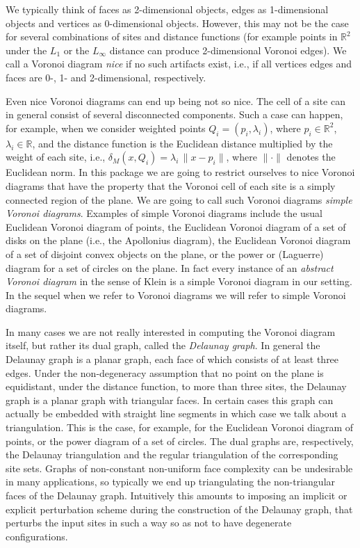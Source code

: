 We typically think of faces as 2-dimensional objects, edges as
1-dimensional objects and vertices as 0-dimensional objects. However,
this may not be the case for several combinations of sites and
distance functions (for example points in $\mathbb{R}^2$ under the
$L_1$ or the $L_\infty$ distance can produce 2-dimensional Voronoi
edges). We call a Voronoi diagram \emph{nice} if no such artifacts
exist, i.e., if all vertices edges and faces are 0-, 1- and
2-dimensional, respectively.

Even nice Voronoi diagrams can end up being not so nice. The cell of a
site can in general consist of several disconnected components. Such a
case can happen, for example, when we consider weighted points
$Q_i=(p_i,\lambda_i)$, where $p_i\in\mathbb{R}^2$,
$\lambda_i\in\mathbb{R}$, and the distance function is 
the Euclidean distance multiplied by the weight of each site, i.e.,
$\delta_M(x,Q_i)=\lambda_i\,\|x-p_i\|$, where $\|\cdot\|$ denotes the
Euclidean norm. In this package we are going to restrict ourselves to
nice Voronoi diagrams that have the property that the Voronoi cell of
each site is a simply connected region of the plane. We are going to
call such Voronoi diagrams \emph{simple Voronoi diagrams}. Examples of
simple Voronoi diagrams include the usual Euclidean Voronoi diagram of
points, the Euclidean Voronoi diagram of a set of disks on the plane
(i.e., the Apollonius diagram), the Euclidean Voronoi diagram of a set
of disjoint convex objects on the plane, or the power or (Laguerre)
diagram for a set of circles on the plane. In fact every instance of
an \emph{abstract Voronoi diagram} in the sense of Klein \cite{k-cavd-89} 
is a simple Voronoi diagram in our setting. In the sequel when we
refer to Voronoi diagrams we will refer to simple Voronoi diagrams.

In many cases we are not really interested in computing the
Voronoi diagram itself, but rather its dual graph, called the
\emph{Delaunay graph}. In general the Delaunay graph is a planar
graph, each face of which consists of at least three edges.
Under the non-degeneracy assumption that no point on the plane is
equidistant, under the distance function, to more than three sites, 
the Delaunay graph is a planar graph with triangular faces.
In certain cases this graph can actually be embedded with straight
line segments in which case we talk about a triangulation. This is the
case, for example, for the Euclidean Voronoi diagram of points, or the
power diagram of a set of circles. The dual graphs are, respectively,
the Delaunay triangulation and the regular triangulation of the
corresponding site sets. Graphs of non-constant non-uniform face
complexity can be undesirable in many applications, so typically we
end up triangulating the non-triangular faces of the Delaunay
graph. Intuitively this amounts to imposing an implicit or explicit
perturbation scheme during the construction of the Delaunay graph,
that perturbs the input sites in such a way so as not to have
degenerate configurations.

